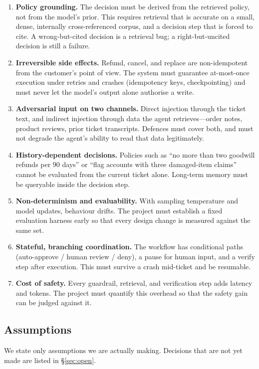 \documentclass[11pt,a4paper]{article}
\begin{document}
\begin{enumerate}[label=\textbf{C\arabic*.}]
  \item \textbf{Policy grounding.} The decision must be derived from the retrieved policy, not from the model's prior. This requires retrieval that is accurate on a small, dense, internally cross-referenced corpus, and a decision step that is forced to cite. A wrong-but-cited decision is a retrieval bug; a right-but-uncited decision is still a failure.
  \item \textbf{Irreversible side effects.} Refund, cancel, and replace are non-idempotent from the customer's point of view. The system must guarantee at-most-once execution under retries and crashes (idempotency keys, checkpointing) and must never let the model's output alone authorise a write.
  \item \textbf{Adversarial input on two channels.} Direct injection through the ticket text, and indirect injection through data the agent retrieves---order notes, product reviews, prior ticket transcripts. Defences must cover both, and must not degrade the agent's ability to read that data legitimately.
  \item \textbf{History-dependent decisions.} Policies such as ``no more than two goodwill refunds per 90 days'' or ``flag accounts with three damaged-item claims'' cannot be evaluated from the current ticket alone. Long-term memory must be queryable inside the decision step.
  \item \textbf{Non-determinism and evaluability.} With sampling temperature and model updates, behaviour drifts. The project must establish a fixed evaluation harness early so that every design change is measured against the same set.
  \item \textbf{Stateful, branching coordination.} The workflow has conditional paths (auto-approve / human review / deny), a pause for human input, and a verify step after execution. This must survive a crash mid-ticket and be resumable.
  \item \textbf{Cost of safety.} Every guardrail, retrieval, and verification step adds latency and tokens. The project must quantify this overhead so that the safety gain can be judged against it.
\end{enumerate}

\subsection{Assumptions}

We state only assumptions we are actually making. Decisions that are not yet made are listed in \S\ref{sec:open}.
\end{document}
